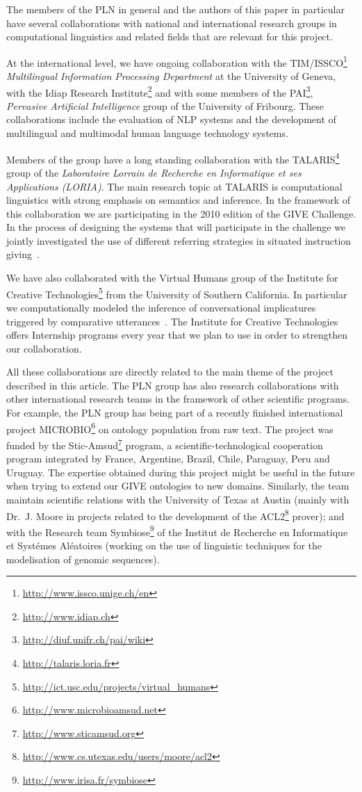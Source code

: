 The members of the PLN in general and the authors of this paper in particular
have several collaborations with national and international research groups in 
computational linguistics and related fields that are relevant for this project. 
 
At the international level, we have ongoing collaboration with the TIM/ISSCO\footnote{\url{http://www.issco.unige.ch/en}} \emph{Multilingual Information Processing Department} at the University of Geneva, with the
Idiap Research Institute\footnote{\url{http://www.idiap.ch}} and  with some
members of the PAI\footnote{\url{http://diuf.unifr.ch/pai/wiki}},
\textit{Pervasive Artificial Intelligence} group of the University of
Fribourg.  These collaborations include the evaluation of NLP systems
and the development of multilingual and multimodal human language
technology systems.

Members of the group have a long standing collaboration  with
the TALARIS\footnote{\url{http://talaris.loria.fr}}
group of the \emph{Laboratoire Lorrain de Recherche en Informatique et ses
Applications (LORIA)}. The main research topic at TALARIS is computational
linguistics
with strong emphasis on semantics and inference. In the framework of this
collaboration we are participating in the 2010 edition of the GIVE
Challenge. In the process of designing the systems that will participate in
the challenge we jointly investigated the use of different referring strategies
in situated instruction
giving~\cite{amoia10}. 

We have also collaborated with the Virtual Humans group of the Institute for
Creative Technologies\footnote{\url{http://ict.usc.edu/projects/virtual_humans}}
from the University of Southern California. In particular we computationally
modeled the inference of conversational implicatures triggered by comparative
utterances~\cite{benotti09a}. The Institute for Creative Technologies offers
Internship programs every year that we plan to use in order to strengthen our
collaboration.

All these collaborations are directly related to the main theme of the project 
described in this article.  The PLN group has also research collaborations with 
other international research teams in the framework of other scientific programs. 
For example, the PLN group has being part of a recently finished international project 
MICROBIO\footnote{\url{http://www.microbioamsud.net}} on ontology population from raw text.
The project was funded by the Stic-Amsud\footnote{\url{http://www.sticamsud.org}} program, 
a scientific-technological cooperation program integrated by France, Argentine, Brazil, 
Chile, Paraguay, Peru and Uruguay. The expertise obtained during this project might
be useful in the future when trying to extend our GIVE ontologies to new domains. 
Similarly, the team maintain scientific relations with the University of Texas at Austin
(mainly with Dr.\ J. Moore in projects related to the development of the ACL2\footnote{\url{http://www.cs.utexas.edu/users/moore/acl2}} prover); and with the 
Research team Symbiose\footnote{\url{http://www.irisa.fr/symbiose}} of the Institut de
Recherche en Informatique et Syst\'emes Al\'eatoires (working on the use of linguistic
techniques for the modelisation of genomic sequences).

